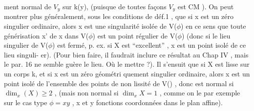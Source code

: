 
ment normal de $V_y$ sur k(y), (puisque de toutes façons   $V_y$ est CM ).
On peut montrer  plus généralement, sous les conditions de déf.1 , que si
x est un zéro singulier ordinaire, alors x est une singularité isolée
de V($\phi$)  en ce sens que toute générisation  x' de x dans V($\phi$) est un
point régulier de V($\phi$)  (donc si le lieu singulier de V($\phi$) est fermé, p.
ex. si X est ``excellent'' , x est  un point isolé de ce lieu singuli-%
er).  (Pour bien faire, il faudrait inclure ce résultat au Chap
IV , mais  le par. 16 ne semble guère le lieu. Où le mettre ?).  Il
s'ensuit que si X est lisse sur un corps k, et si x est un zéro géométri%
quement singulier ordinaire, alors  x est un point isolé de l'ensemble
des points de non lissité  de V() , donc est  normal si  $\dim_x(X) \geqslant 2$ ,
(mais  non normal si $\dim_x X = 1$ , comme on le   par exemple sur
le cas type $\phi = xy$ , x et y fonctions coordonnées dans le plan affine).



